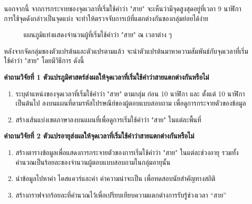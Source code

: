 \documentclass[a4paper]{article}
\begin{document}
    นอกจากนี้ จากการกระจายของจุดเวลาที่เริ่มใช้คำว่า "สาย" จะเห็นว่ามีจุดสูงสุดอยู่ที่เวลา 9 นาฬิกา การใช้จุดดังกล่าวเป็นจุดแบ่ง จะทำให้ตรวจจับการเบ้ที่แตกต่างกันของกลุ่มย่อยได้ง่าย
    \begin{figure}[!ht]
        \begin{center}
        \end{center}
        \caption{แผนภูมิแท่งแสดงจำนวนผู้ที่เริ่มใช้คำว่า "สาย" ณ เวลาต่าง ๆ}
    \end{figure}

    หลังจากจัดกลุ่มของตัวแปรต้นและตัวแปรตามแล้ว จะนำตัวแปรต้นมาหาความสัมพันธ์กับจุดเวลาที่เริ่มใช้คำว่า "สาย" โดยมีวิธีการ ดังนี้

    \textbf{คำถามวิจัยที่ 1 ตัวแปรภูมิศาสตร์ส่งผลให้จุดเวลาที่เริ่มใช้คำว่าสายแตกต่างกันหรือไม่}
    \begin{enumerate}
        \item ระบุตำแหน่งของจุดเวลาที่เริ่มใช้คำว่า "สาย" ตามกลุ่ม  ก่อน 10 นาฬิกา  และ ตั้งแต่ 10 นาฬิกาเป็นต้นไป ลงบนแผนที่ตามรหัสไปรษณีย์ของผู้ตอบแบบสอบถาม เพื่อดูการกระจายตัวของข้อมูล
        \item สร้างเส้นแบ่งเขตภาษาลงบนแผนที่เพื่อดูการเริ่มใช้คำว่า "สาย" ในแต่ละพื้นที่
    \end{enumerate}

    \textbf{คำถามวิจัยที่ 2 ตัวแปรอายุส่งผลให้จุดเวลาที่เริ่มใช้คำว่าสายแตกต่างกันหรือไม่}
    \begin{enumerate}
        \item สร้างตารางข้อมูลเพื่อแสดงการกระจายตัวของการเริ่มใช้คำว่า "สาย" ในแต่ละช่วงอายุ รวมทั้งคำนวณเป็นร้อยละของจำนวนผู้ตอบแบบสอบถามในกลุ่มอายุนั้น
        \item นำข้อมูลไปหาค่า ไคสแควร์และค่า  ค่าความน่าจะเป็น เพื่อทดสอบนัยสำคัญทางสถิติ
        \item สร้างกราฟจากร้อยละที่คำนวณไว้เพื่อเปรียบเทียบความแตกต่างการรับรู้ช่วงเวลา “สาย”
    \end{enumerate}
\end{document}
